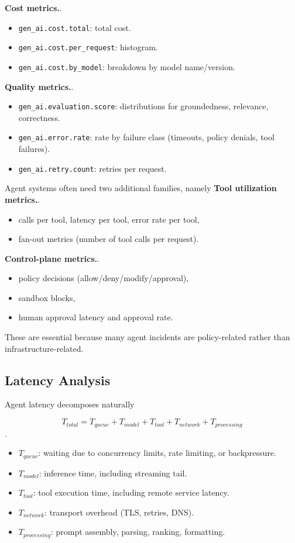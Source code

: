 \textbf{Cost metrics.}.
\begin{itemize}
\item \texttt{gen\_ai.cost.total}: total cost.
\item \texttt{gen\_ai.cost.per\_request}: histogram.
\item \texttt{gen\_ai.cost.by\_model}: breakdown by model name/version.
\end{itemize}

\textbf{Quality metrics.}.
\begin{itemize}
\item \texttt{gen\_ai.evaluation.score}: distributions for groundedness, relevance, correctness.
\item \texttt{gen\_ai.error.rate}: rate by failure class (timeouts, policy denials, tool failures).
\item \texttt{gen\_ai.retry.count}: retries per request.
\end{itemize}

Agent systems often need two additional families, namely \textbf{Tool utilization metrics.}.
\begin{itemize}
\item calls per tool, latency per tool, error rate per tool,
\item fan-out metrics (number of tool calls per request).
\end{itemize}

\textbf{Control-plane metrics.}.
\begin{itemize}
\item policy decisions (allow/deny/modify/approval),
\item sandbox blocks,
\item human approval latency and approval rate.
\end{itemize}

These are essential because many agent incidents are policy-related rather than infrastructure-related.

\subsection{Latency Analysis}

Agent latency decomposes naturally

\[
T_{total} = T_{queue} + T_{model} + T_{tool} + T_{network} + T_{processing}
\].

\begin{itemize}
\item $T_{queue}$: waiting due to concurrency limits, rate limiting, or backpressure.
\item $T_{model}$: inference time, including streaming tail.
\item $T_{tool}$: tool execution time, including remote service latency.
\item $T_{network}$: transport overhead (TLS, retries, DNS).
\item $T_{processing}$: prompt assembly, parsing, ranking, formatting.
\end{itemize}

